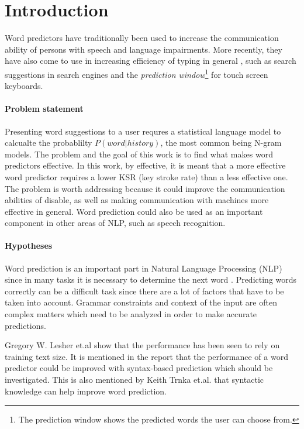 \section{Introduction}
Word predictors have traditionally been used to increase the communication ability of persons with speech and language impairments\cite{Lesher99effectsof}\cite{keystrokes}\cite{corpus}. More recently, they have also come to use in increasing efficiency of typing in general \cite{Lesher99effectsof}, such as search suggestions in search engines and the \emph{prediction window}\footnote{The prediction window shows the predicted words the user can choose from.} for touch screen keyboards. 

\paragraph{Problem statement}
Presenting word suggestions to a user requres a statistical language model\cite{keystrokes} to calcualte the probablilty $P(word|history)$, the most common being N-gram models\cite{Wandmacher}. The problem and the goal of this work is to find what makes word predictors effective. In this work, by effective, it is meant that a more effective word predictor requires a lower KSR (key stroke rate) than a less effective one. The problem is worth addressing because it could improve the communication abilities of disable, as well as making communication with machines more effective in general. Word prediction could also be used as an important component in other areas of NLP, such as speech recognition.

\paragraph{Hypotheses}
Word prediction is an important part in Natural Language Processing (NLP) since in many tasks it is necessary to determine the next word  \cite{DBLP:journals/corr/cs-CL-0009027}.  Predicting words correctly can be a difficult task since there are a lot of factors that have to be taken into account. Grammar constraints and context of the input are often complex matters which need to be analyzed in order to make accurate predictions.
 
Gregory W. Lesher et.al \cite{Lesher99effectsof} show that the performance has been seen to rely on training text size. It is mentioned in the report that the performance of a word predictor could be improved with syntax-based prediction which should be investigated. This is also mentioned by Keith Trnka et.al.\cite{keystrokes} that syntactic knowledge can help improve word prediction.
 

